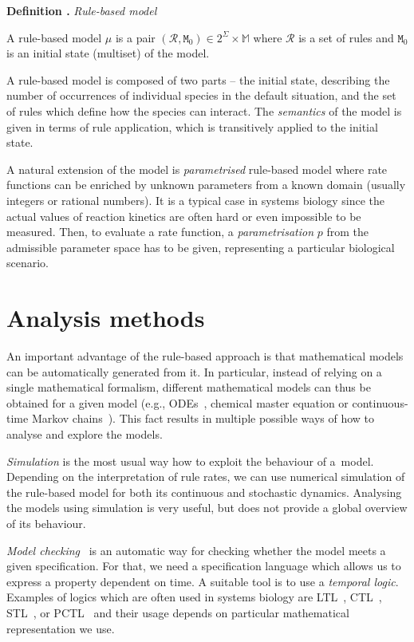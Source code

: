 \documentclass[11pt,a4paper]{report}
\newcounter{counter}[section]
\renewcommand{\thecounter}{\thechapter.\arabic{counter}}
\newenvironment{definition}[1]{\bigskip\refstepcounter{counter}\noindent\textbf{Definition \thecounter } \emph{#1} \par\nopagebreak\noindent \begin{itshape}}{\end{itshape}\bigskip}
\begin{document}
\begin{definition}{Rule-based model}
A rule-based model $\mu$ is a pair $(\mathcal{R}, \mathtt{M}_0) \in 2^\Sigma \times \mathbb{M}$ where $\mathcal{R}$ is a set of rules and $\mathtt{M}_0$ is an initial state (multiset) of the model.
\end{definition}

A rule-based model is composed of two parts -- the initial state, describing the number of occurrences of individual species in the default situation, and the set of rules which define how the species can interact. The \emph{semantics} of the model is given in terms of rule application, which is transitively applied to the initial state.

A natural extension of the model is \emph{parametrised} rule-based model where rate functions can be enriched by unknown parameters from a known domain (usually integers or rational numbers). It is a typical case in systems biology since the actual values of reaction kinetics are often hard or even impossible to be measured. Then, to evaluate a rate function, a \emph{parametrisation} $p$ from the admissible parameter space has to be given, representing a particular biological scenario.

\section{Analysis methods}

An important advantage of the rule-based approach is that mathematical models can be automatically generated from it. In particular, instead of relying on a single mathematical formalism, different mathematical models can thus be obtained for a given model (e.g., ODEs~\cite{camporesi2017k}, chemical master equation or continuous-time Markov chains~\cite{pauleve2010generic,sneddon2011efficient}). This fact results in multiple possible ways of how to analyse and explore the models. 

\emph{Simulation} is the most usual way how to exploit the behaviour of a~model. Depending on the interpretation of rule rates, we can use numerical simulation of the rule-based model for both its continuous and stochastic dynamics. Analysing the models using simulation is very useful, but does not provide a global overview of its behaviour.

\emph{Model checking}~\cite{clarke2018model} is an automatic way for checking whether the model meets a given specification. For that, we need a specification language which allows us to express a property dependent on time. A suitable tool is to use a \emph{temporal logic}. Examples of logics which are often used in systems biology are LTL~\cite{pnueli1977temporal}, CTL~\cite{clarke1986automatic}, STL~\cite{maler2004monitoring}, or PCTL~\cite{hasson1994logic} and their usage depends on particular mathematical representation we use.
\end{document}
